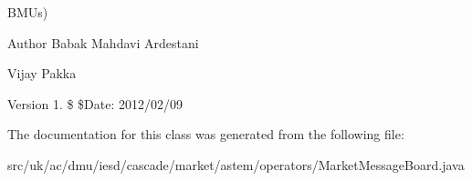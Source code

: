 B\-M\-Us)

\begin{DoxyAuthor}{Author}
Babak Mahdavi Ardestani 

Vijay Pakka 
\end{DoxyAuthor}
\begin{DoxyVersion}{Version}
1. \$ \$\-Date\-: 2012/02/09 
\end{DoxyVersion}


The documentation for this class was generated from the following file\-:\begin{DoxyCompactItemize}
\item 
src/uk/ac/dmu/iesd/cascade/market/astem/operators/Market\-Message\-Board.\-java\end{DoxyCompactItemize}
